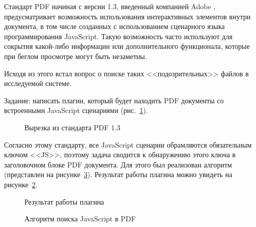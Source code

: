 Стандарт PDF начиная с версии 1.3, введенный компанией Adobe \cite{adobe}, предусматривает возможность использования интерактивных элементов внутри документа, в том числе созданных с использованием сценарного языка программирования JavaScript. Такую возможность часто используют для сокрытия какой-либо информации или дополнительного функционала, которые при беглом просмотре могут быть незаметны. 

Исходя из этого встал вопрос о поиске таких <<подозрительных>> файлов в исследуемой системе.

Задание: написать плагин, который будет находить PDF документы со встроенными JavaScript сценариями (рис.~\ref{lob_8:lob_8}).

\begin{figure}[h!]
\caption{Вырезка из стандарта PDF 1.3}
\label{lob_8:lob_8}
\end{figure}

Согласно этому стандарту, все JavaScript сценарии обрамляются обязательным ключом <<JS>>, поэтому задача сводится к обнаружению этого ключа в заголовочном блоке PDF документа. Для этого был реализован алгоритм (представлен на рисунке~\ref{lob_9:lob_9}). Результат работы плагина можно увидеть на рисунке~\ref{lob_10:lob_10}.

\begin{figure}[h!]
\caption{Результат работы плагина}
\label{lob_10:lob_10}
\end{figure}

\begin{figure}[h!]
\caption{Алгоритм поиска JavaScript в PDF}
\label{lob_9:lob_9}
\end{figure}

\clearpage
